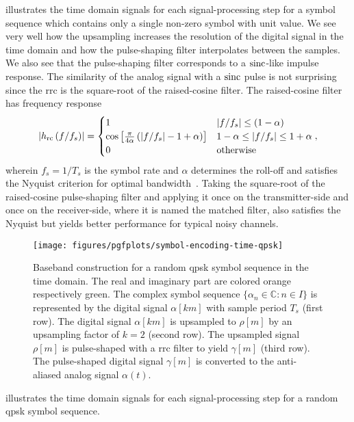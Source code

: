  illustrates the time domain signals for each signal-processing step for a symbol sequence which contains only a single non-zero symbol with unit value.
We see very well how the upsampling increases the resolution of the digital signal in the time domain and how the pulse-shaping filter interpolates between the samples.
We also see that the pulse-shaping filter corresponds to a $\sinc$-like impulse response.
The similarity of the analog signal with a $\sinc$ pulse is not surprising since the \gls{rrc} is the square-root of the raised-cosine filter.
The raised-cosine filter has frequency response
\begin{equation}
	\abs{h_\text{rc}\left(f/f_s\right)}
	=
	\begin{cases}
		1 & \abs*{f/f_s}\leq(1-\alpha) \\
		\cos\left[\frac{\pi}{4\alpha}\left(\abs*{f/f_s}-1+\alpha\right)\right] & 1-\alpha\leq\abs*{f/f_s}\leq1+\alpha \\
		0 & \text{otherwise}
	\end{cases}
	,
\end{equation}
wherein $f_s=1/T_s$ is the symbol rate and $\alpha$ determines the roll-off and satisfies the Nyquist criterion for optimal bandwidth~\cite[p.~51]{Madhow2008}.
Taking the square-root of the raised-cosine pulse-shaping filter and applying it once on the transmitter-side and once on the receiver-side, where it is named the matched filter, also satisfies the Nyquist but yields better performance for typical noisy channels.
\begin{figure}[htb]
	\centering
	\texttt{[image: figures/pgfplots/symbol-encoding-time-qpsk]}
	\caption{Baseband construction for a random \gls{qpsk} symbol sequence in the time domain. The real and imaginary part are colored orange respectively green. The complex symbol sequence $\{\alpha_n\in\mathbb{C}\colon n\in I\}$ is represented by the digital signal $\alpha[km]$ with sample period $T_s$ (first row). The digital signal $\alpha[km]$ is upsampled to $\rho[m]$ by an upsampling factor of $k=2$ (second row). The upsampled signal $\rho[m]$ is pulse-shaped with a \gls{rrc} filter to yield $\gamma[m]$ (third row). The pulse-shaped digital signal $\gamma[m]$ is converted to the anti-aliased analog signal $\alpha(t)$.}\label{fig:baseband_construction_rand_time}
\end{figure}
 illustrates the time domain signals for each signal-processing step for a random \gls{qpsk} symbol sequence.
